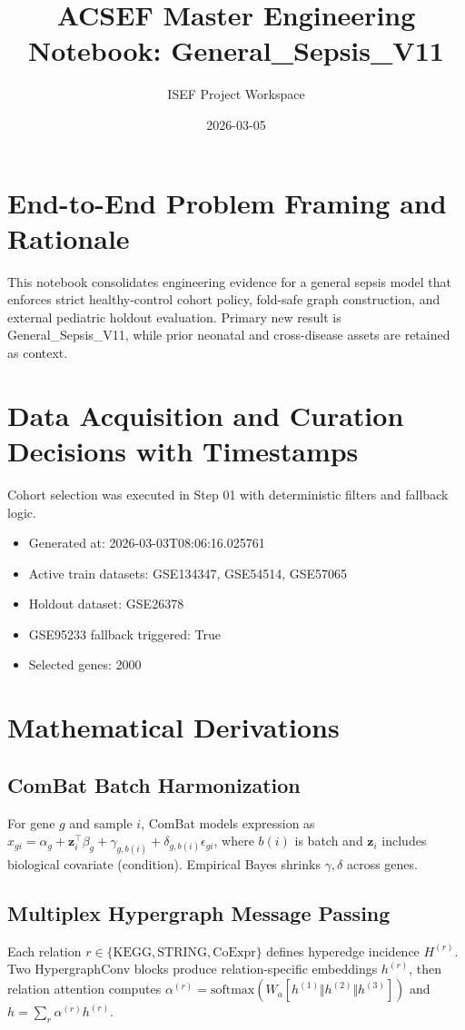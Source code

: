 \documentclass[11pt]{article}
\title{ACSEF Master Engineering Notebook: General\_Sepsis\_V11}
\author{ISEF Project Workspace}
\date{2026-03-05}
\begin{document}
\maketitle
\tableofcontents
\newpage
\section{End-to-End Problem Framing and Rationale}
This notebook consolidates engineering evidence for a general sepsis model that enforces strict healthy-control cohort policy, fold-safe graph construction, and external pediatric holdout evaluation. Primary new result is General\_Sepsis\_V11, while prior neonatal and cross-disease assets are retained as context.
\section{Data Acquisition and Curation Decisions with Timestamps}
Cohort selection was executed in Step 01 with deterministic filters and fallback logic.
\begin{itemize}
\item Generated at: 2026-03-03T08:06:16.025761
\item Active train datasets: GSE134347, GSE54514, GSE57065
\item Holdout dataset: GSE26378
\item GSE95233 fallback triggered: True
\item Selected genes: 2000
\end{itemize}
\section{Mathematical Derivations}
\subsection{ComBat Batch Harmonization}
For gene $g$ and sample $i$, ComBat models expression as $x_{gi} = \alpha_g + \mathbf{z}_i^\top\beta_g + \gamma_{g,b(i)} + \delta_{g,b(i)}\epsilon_{gi}$, where $b(i)$ is batch and $\mathbf{z}_i$ includes biological covariate (condition). Empirical Bayes shrinks $\gamma,\delta$ across genes.
\subsection{Multiplex Hypergraph Message Passing}
Each relation $r \in \{\mathrm{KEGG},\mathrm{STRING},\mathrm{CoExpr}\}$ defines hyperedge incidence $H^{(r)}$. Two HypergraphConv blocks produce relation-specific embeddings $h^{(r)}$, then relation attention computes $\alpha^{(r)} = \mathrm{softmax}(W_a[h^{(1)}\Vert h^{(2)}\Vert h^{(3)}])$ and $h = \sum_r \alpha^{(r)} h^{(r)}$.
\end{document}
